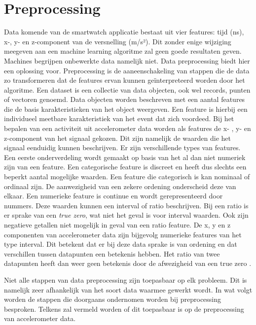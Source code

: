 \section{Preprocessing} \label{section:preprocessing}
Data komende van de smartwatch applicatie bestaat uit vier features: tijd (ns), x-, y- en z-component van de versnelling (m/s²). Dit zonder enige wijziging meegeven aan een machine learning algoritme zal geen goede resultaten geven.
Machines begrijpen onbewerkte data namelijk niet. Data preprocessing biedt hier een oplossing voor. Preprocessing is de aaneenschakeling van stappen die de data zo transformeren dat de features ervan kunnen geïnterpreteerd worden door het algoritme. 
Een dataset is een collectie van data objecten, ook wel records, punten of vectoren genoemd. Data objecten worden beschreven met een aantal features die de basis karakteristieken van het object weergeven. Een feature is hierbij een individueel meetbare karakteristiek van het event dat zich voordeed. 
Bij het bepalen van een activiteit uit accelerometer data worden als features de x- , y- en z-component van het signaal gekozen. Dit zijn namelijk de waarden die het signaal eenduidig kunnen beschrijven. 
Er zijn verschillende types van features. Een eerste onderverdeling wordt gemaakt op basis van het al dan niet numeriek zijn van een feature. 
Een categorische feature is discreet en heeft dus slechts een beperkt aantal mogelijke waarden. Een feature die categorisch is kan nominaal of ordinaal zijn. De aanwezigheid van een zekere ordening onderscheid deze van elkaar. 
Een numerieke feature is continue en wordt gerepresenteerd door nummers. Deze waarden kunnen een interval of ratio beschrijven. Bij een ratio is er sprake van een \textit{true zero}, wat niet het geval is voor interval waarden. Ook zijn negatieve getallen niet mogelijk in geval van een ratio feature. 
De x, y en z componenten van accelerometer data zijn bijgevolg numerieke features van het type interval. Dit betekent dat er bij deze data sprake is van ordening en dat verschillen tussen datapunten een betekenis hebben. Het ratio van twee datapunten heeft dan weer geen betekenis door de afwezigheid van een true zero \cite{ref69}.
 
Niet alle stappen van data preprocessing zijn toepasbaar op elk probleem. Dit is namelijk zeer afhankelijk van het soort data waarmee gewerkt wordt. 
In wat volgt worden de stappen die doorgaans ondernomen worden bij preprocessing besproken. Telkens zal vermeld worden of dit toepasbaar is op de preprocessing van accelerometer data.

